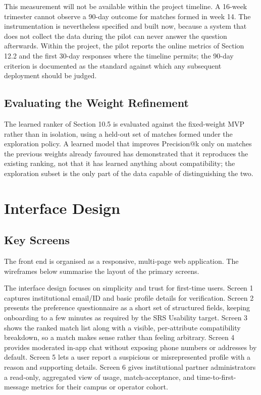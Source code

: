 \documentclass[12pt,a4paper]{report}
\begin{document}
This measurement will not be available within the project timeline. A 16-week trimester cannot observe a 90-day outcome for matches formed in week 14. The instrumentation is nevertheless specified and built now, because a system that does not collect the data during the pilot can never answer the question afterwards. Within the project, the pilot reports the online metrics of Section 12.2 and the first 30-day responses where the timeline permits; the 90-day criterion is documented as the standard against which any subsequent deployment should be judged.

\section{Evaluating the Weight Refinement}

The learned ranker of Section 10.5 is evaluated against the fixed-weight MVP rather than in isolation, using a held-out set of matches formed under the exploration policy. A learned model that improves Precision@k only on matches the previous weights already favoured has demonstrated that it reproduces the existing ranking, not that it has learned anything about compatibility; the exploration subset is the only part of the data capable of distinguishing the two.

\chapter{Interface Design}

\section{Key Screens}

The front end is organised as a responsive, multi-page web application. The wireframes below summarise the layout of the primary screens.

\vspace{4mm}

The interface design focuses on simplicity and trust for first-time users. Screen 1 captures institutional email/ID and basic profile details for verification. Screen 2 presents the preference questionnaire as a short set of structured fields, keeping onboarding to a few minutes as required by the SRS Usability target. Screen 3 shows the ranked match list along with a visible, per-attribute compatibility breakdown, so a match makes sense rather than feeling arbitrary. Screen 4 provides moderated in-app chat without exposing phone numbers or addresses by default. Screen 5 lets a user report a suspicious or misrepresented profile with a reason and supporting details. Screen 6 gives institutional partner administrators a read-only, aggregated view of usage, match-acceptance, and time-to-first-message metrics for their campus or operator cohort.
\end{document}

